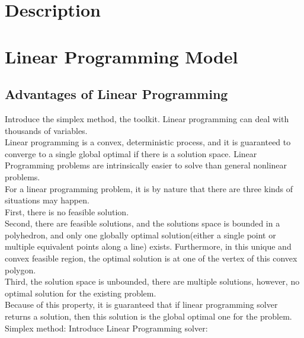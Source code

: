 \label{chapter:Simplified molecular model}

\section{Description}
\section{}
\section{Linear Programming Model}
\subsection{Advantages of Linear Programming}
Introduce the simplex method, the toolkit.
Linear programming can deal with thousands of variables.\\

Linear programming is a convex, deterministic process, and it is guaranteed to converge to a single global optimal if there is a solution space. Linear Programming problems are intrinsically easier to solve than general nonlinear problems.\\

For a linear programming problem, it is by nature that there are three kinds of situations may happen.\\

First, there is no feasible solution.\\

Second, there are feasible solutions, and the solutions space is bounded in a polyhedron, and only one globally optimal solution(either a single point or multiple equivalent points along a line) exists. Furthermore, in this unique and convex feasible region, the optimal solution is at one of the vertex of this convex polygon.\\

Third, the solution space is unbounded, there are multiple solutions, however, no optimal solution for the existing problem.\\

Because of this property, it is guaranteed that if linear programming solver returns a solution, then this solution is the global optimal one for the problem.\\

Simplex method:
Introduce Linear Programming solver:


